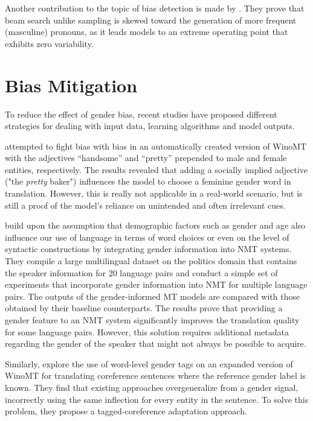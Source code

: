 Another contribution to the topic of bias detection is made by \citet{roberts2020decoding}. They prove that beam search unlike sampling is skewed toward the generation of more frequent (masculine) pronouns, as it leads models to an extreme operating point that exhibits zero variability.

\section{Bias Mitigation}
\label{sec:Background:Bias_Mitigation}

To reduce the effect of gender bias, recent studies have proposed different strategies for dealing with input data, learning algorithms and model outputs. 

\citet{Stanovsky_2019} attempted to fight bias with bias in an automatically created version of WinoMT with the adjectives “handsome” and “pretty” prepended to male and female entities, respectively. The results revealed that adding a socially implied adjective ("the \textit{pretty} baker") influences the model to choose a feminine gender word in translation. However, this is really not applicable in a real-world scenario, but is still a proof of the model’s reliance on unintended and often irrelevant cues.

\citet{Vanmassenhove_2018} build upon the assumption that demographic factors such as gender and age also influence our use of language in terms of word choices or even on the level of syntactic constructions by integrating gender information into NMT systems. They compile a large multilingual dataset on the politics domain that contains the speaker information for 20 language pairs and conduct a simple set of experiments that incorporate gender information into NMT for multiple language pairs. The outputs of the gender-informed MT models are compared with those obtained by their baseline counterparts. The results prove that providing a gender feature to an NMT system significantly improves the translation quality for some language pairs. However, this solution requires additional metadata regarding the gender of the speaker that might not always be possible to acquire.

Similarly, \citet{Saunders_2020_coreference} explore the use of word-level gender tags on an expanded version of WinoMT for translating coreference sentences where the reference gender label is known. They find that existing approaches overgeneralize from a gender signal, incorrectly using the same inflection for every entity in the sentence. To solve this problem, they propose a tagged-coreference adaptation approach.

